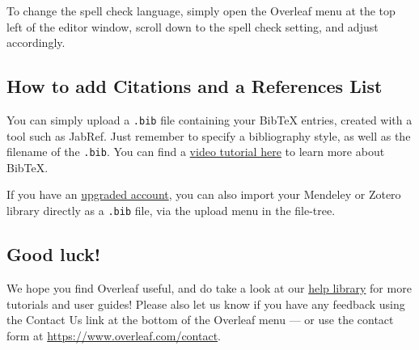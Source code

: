 \documentclass{article}
\begin{document}
To change the spell check language, simply open the Overleaf menu at the top left of the editor window, scroll down to the spell check setting, and adjust accordingly.

\subsection{How to add Citations and a References List}

You can simply upload a \verb|.bib| file containing your BibTeX entries, created with a tool such as JabRef. Just remember to specify a bibliography style, as well as the filename of the \verb|.bib|. You can find a \href{https://www.overleaf.com/help/97-how-to-include-a-bibliography-using-bibtex}{video tutorial here} to learn more about BibTeX.

If you have an \href{https://www.overleaf.com/user/subscription/plans}{upgraded account}, you can also import your Mendeley or Zotero library directly as a \verb|.bib| file, via the upload menu in the file-tree.

\subsection{Good luck!}

We hope you find Overleaf useful, and do take a look at our \href{https://www.overleaf.com/learn}{help library} for more tutorials and user guides! Please also let us know if you have any feedback using the Contact Us link at the bottom of the Overleaf menu --- or use the contact form at \url{https://www.overleaf.com/contact}.



\end{document}
